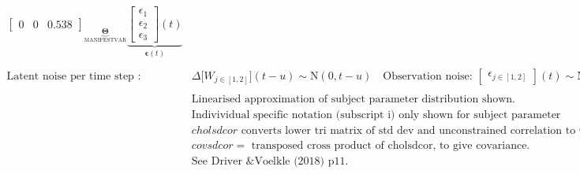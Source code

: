 \documentclass[a4paper]{article}
\newcommand{\vect}[1]{\boldsymbol{\mathbf{#1}}}
\begin{document}
\begin{footnotesize}
\begin{align*}
{\begin{bmatrix}
0 & 0 & 0.538
\end{bmatrix}  
              }_{\underbrace{\vect{\Theta}}_\textrm{MANIFESTVAR}}
              \underbrace{
          \begin{bmatrix}
\epsilon_{1}\\ 
\epsilon_{2}\\ 
\epsilon_{3}
\end{bmatrix} 
          (t)}_{\vect{\epsilon}(t)} \\ \\
                \textrm{Latent noise per time step : }
          &\Delta \big[W_{j \in [1,2]}\big](t-u)   \sim  \mathrm{N}(0,t-u) \quad
              \textrm{Observation noise: }
            \begin{bmatrix}
\epsilon_{j \in [1,2]}
\end{bmatrix} 
            (t) \sim  \mathrm{N}(0,1) \\ \\&\textrm{Linearised approximation of subject parameter distribution shown.}\\
            &\textrm{Indivividual specific notation (subscript i) only shown for subject parameter distribution -- pop. means shown elsewhere.} \\
&cholsdcor\textrm{ converts lower tri matrix of std dev and unconstrained correlation to Cholesky factor covariance.} \\
&covsdcor =\textrm{ transposed cross product of cholsdcor, to give covariance.} \\
&\textrm{See Driver \& Voelkle (2018) p11.}
      \end{align*}
      \end{footnotesize}
      
\end{document}
